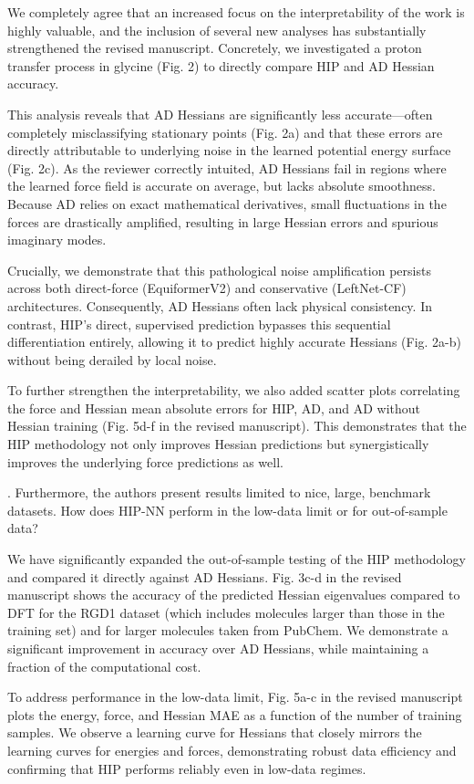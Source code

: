 \documentclass[11pt,letterpaper]{article}
\begin{document}
\vspace{1mm}
{\color{responsecolour}
\noindent We completely agree that an increased focus on the interpretability of the work is highly valuable, and the inclusion of several new analyses has substantially strengthened the revised manuscript. Concretely, we investigated a proton transfer process in glycine (Fig. 2) to directly compare HIP and AD Hessian accuracy.

This analysis reveals that AD Hessians are significantly less accurate—often completely misclassifying stationary points (Fig. 2a) and that these errors are directly attributable to underlying noise in the learned potential energy surface (Fig. 2c). As the reviewer correctly intuited, AD Hessians fail in regions where the learned force field is accurate on average, but lacks absolute smoothness. Because AD relies on exact mathematical derivatives, small fluctuations in the forces are drastically amplified, resulting in large Hessian errors and spurious imaginary modes.

Crucially, we demonstrate that this pathological noise amplification persists across both direct-force (EquiformerV2) and conservative (LeftNet-CF) architectures. Consequently, AD Hessians often lack physical consistency. In contrast, HIP’s direct, supervised prediction bypasses this sequential differentiation entirely, allowing it to predict highly accurate Hessians (Fig. 2a-b) without being derailed by local noise.

To further strengthen the interpretability, we also added scatter plots correlating the force and Hessian mean absolute errors for HIP, AD, and AD without Hessian training (Fig. 5d-f in the revised manuscript). This demonstrates that the HIP methodology not only improves Hessian predictions but synergistically improves the underlying force predictions as well.

}
\vspace{1mm}

. Furthermore, the authors present results limited to nice, large, benchmark datasets. How does HIP-NN perform in the low-data limit or for out-of-sample data?

{\color{responsecolour}
\noindent We have significantly expanded the out-of-sample testing of the HIP methodology and compared it directly against AD Hessians. Fig. 3c-d in the revised manuscript shows the accuracy of the predicted Hessian eigenvalues compared to DFT for the RGD1 dataset (which includes molecules larger than those in the training set) and for larger molecules taken from PubChem. We demonstrate a significant improvement in accuracy over AD Hessians, while maintaining a fraction of the computational cost.

To address performance in the low-data limit, Fig. 5a-c in the revised manuscript plots the energy, force, and Hessian MAE as a function of the number of training samples. We observe a learning curve for Hessians that closely mirrors the learning curves for energies and forces, demonstrating robust data efficiency and confirming that HIP performs reliably even in low-data regimes.

}
\vspace{1mm}
\end{document}
